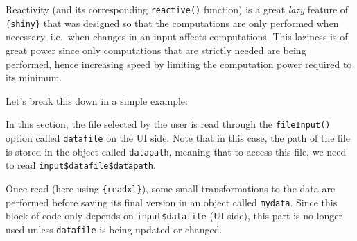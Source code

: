 \documentclass[
]{krantz}
\makeatletter
\newenvironment{Shaded}{\begin{snugshade}}{\end{snugshade}}
\newcommand{\AttributeTok}[1]{\textcolor[rgb]{0.61,0.61,0.61}{#1}}
\newcommand{\DecValTok}[1]{\textcolor[rgb]{0.06,0.06,0.06}{#1}}
\newcommand{\FunctionTok}[1]{\textcolor[rgb]{0,0,0}{#1}}
\newcommand{\NormalTok}[1]{#1}
\newcommand{\OtherTok}[1]{\textcolor[rgb]{0.37,0.37,0.37}{#1}}
\newcommand{\SpecialCharTok}[1]{\textcolor[rgb]{0,0,0}{#1}}
\newcommand{\StringTok}[1]{\textcolor[rgb]{0.5,0.5,0.5}{#1}}
\newenvironment{kframe}{%
\medskip{}
\setlength{\fboxsep}{.8em}
 \def\at@end@of@kframe{}%
 \ifinner\ifhmode%
  \def\at@end@of@kframe{\end{minipage}}%
  \begin{minipage}{\columnwidth}%
 \fi\fi%
 \def\FrameCommand##1{\hskip\@totalleftmargin \hskip-\fboxsep
 \colorbox{shadecolor}{##1}\hskip-\fboxsep
     \hskip-\linewidth \hskip-\@totalleftmargin \hskip\columnwidth}%
 \MakeFramed {\advance\hsize-\width
   \@totalleftmargin\z@ \linewidth\hsize
   \@setminipage}}%
 {\par\unskip\endMakeFramed%
 \at@end@of@kframe}
\renewenvironment{Shaded}{\begin{kframe}}{\end{kframe}}
\makeatother
\begin{document}
Reactivity (and its corresponding \texttt{reactive()} function) is a great \emph{lazy} feature of \texttt{\{shiny\}} that was designed so that the computations are only performed when necessary, i.e.~when changes in an input affects computations. This laziness is of great power since only computations that are strictly needed are being performed, hence increasing speed by limiting the computation power required to its minimum.

Let's break this down in a simple example:

\begin{Shaded}
\end{Shaded}

In this section, the file selected by the user is read through the \texttt{fileInput()} option called \texttt{datafile} on the UI side. Note that in this case, the path of the file is stored in the object called \texttt{datapath}, meaning that to access this file, we need to read \texttt{input\$datafile\$datapath}.

Once read (here using \texttt{\{readxl\}}), some small transformations to the data are performed before saving its final version in an object called \texttt{mydata}. Since this block of code only depends on \texttt{input\$datafile} (UI side), this part is no longer used unless \texttt{datafile} is being updated or changed.
\end{document}
